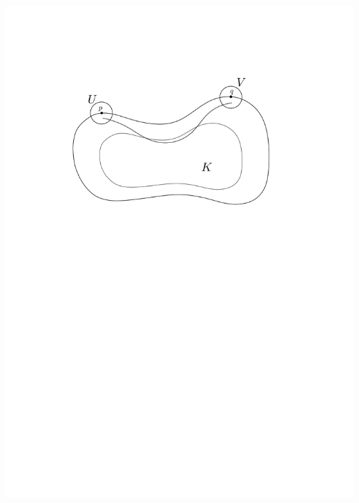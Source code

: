 \begin{frame}[t]
{    \includegraphics[width=1.05\textwidth, trim=0 18cm 0 3cm]{vis3.png}
  }
\end{frame}
